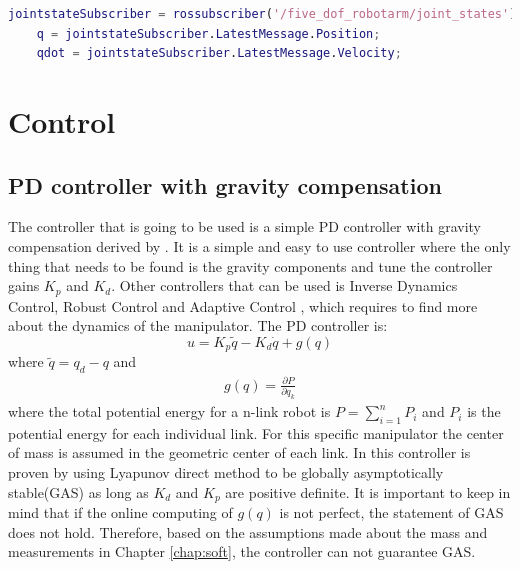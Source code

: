 \begin{lstlisting}[language=Matlab,caption={MATLAB code for the joint state subscriber},label={lst:matlabSubs}]
    jointstateSubscriber = rossubscriber('/five_dof_robotarm/joint_states');
    q = jointstateSubscriber.LatestMessage.Position;  
    qdot = jointstateSubscriber.LatestMessage.Velocity;
\end{lstlisting}














\section{Control}
\subsection{PD controller with gravity compensation}
The controller that is going to be used is a simple PD controller with gravity compensation derived by \cite{spong,Siciliano}. It is a simple and easy to use controller where the only thing that needs to be found is the gravity components and tune the controller gains $K_p$ and $K_d$. Other controllers that can be used is Inverse Dynamics Control, Robust Control and Adaptive Control \cite{spong,Siciliano}, which requires to find more about the dynamics of the manipulator. The PD controller is:
$$
    u=K_p\tilde{q} - K_d\dot{q} +g(q)
$$
 where $\tilde{q} = q_d - q$ and 
 \begin{align}\label{eq:gravity}
 g(q) = \frac{\partial P}{\partial q_k}
 \end{align}
 where the total potential energy for a n-link robot is $P = \sum^n_{i=1}P_i$ and $P_i$ is the potential energy for each individual link. For this specific manipulator the center of mass is assumed in the geometric center of each link. In \cite{Siciliano} this controller is proven by using Lyapunov direct method to be globally asymptotically stable(GAS) as long as $K_d$ and $K_p$ are positive definite. It is important to keep in mind that if the online computing of $g(q)$ is not perfect, the statement of GAS does not hold. Therefore, based on the assumptions made about the mass and measurements in Chapter \ref{chap:soft}, the controller can not guarantee GAS. 
 

